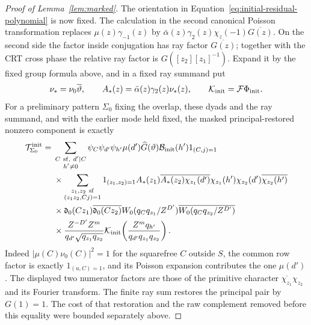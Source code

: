 \documentclass[12pt]{article}
\begin{document}
\begin{proof}[Proof of Lemma~\ref{lem:marked}]
The orientation in Equation~\eqref{eq:initial-residual-polynomial}
is now fixed.  The calculation in the second canonical Poisson
transformation replaces \(\mu(z)\gamma_{-1}(z)\) by
\(\bar\alpha(z)\gamma_2(z)\chi_z(-1)\overline{G(z)}\).
On the second side the factor inside conjugation has ray factor
\(\overline{G(z)}\); together with the CRT cross phase the relative
ray factor is \(G([z_2][z_1]^{-1})\).  Expand it by the fixed group
formula above, and in a fixed ray summand put
\[
 \nu_*=\nu_0\overline\vartheta,\qquad
 A_*(z)=\bar\alpha(z)\gamma_2(z)\nu_*(z),\qquad
 \mathcal K_{\rm init}=\mathcal F\Phi_{\rm init}.
\]
For a preliminary pattern \(\Sigma_0\) fixing the overlap, these
dyads and the ray summand, and with the earlier mode held fixed, the masked
principal-restored nonzero component is exactly
\begin{equation}\label{eq:initial-formal-component}
 \begin{split}
 \mathcal T^{\rm init}_{\Sigma_0}={}&
 \sum_{\substack{C\ {\rm sf},\ d'\mid C\\h'\ne0}}
 \psi_C\psi_{d'}\psi_{h'}\mu(d')\widehat G(\vartheta)
 \mathcal B_{\rm init}(h')1_{(C,j)=1}\\
 &\times\sum_{\substack{z_1,z_2\ {\rm sf}\\(z_1z_2,Cj)=1}}
 1_{(z_1,z_2)=1}
 A_*(z_1)\overline{A_*(z_2)}
 \overline{\chi_{z_1}(d')}\chi_{z_1}(h')
 \chi_{z_2}(d')\overline{\chi_{z_2}(h')}\\
 &\times\mathfrak d_0(Cz_1)\overline{\mathfrak d_0(Cz_2)}
 W_0(q_Cq_{z_1}/Z^{D'})\overline{W_0(q_Cq_{z_2}/Z^{D'})}\\
 &\times\frac{Z^{-D'}Z^m}{q_{d'}\sqrt{q_{z_1}q_{z_2}}}
 \mathcal K_{\rm init}\!\left(
       \frac{Z^mq_{h'}}{q_{d'}q_{z_1}q_{z_2}}\right).
 \end{split}
\end{equation}
Indeed \(|\mu(C)\nu_0(C)|^2=1\) for the squarefree \(C\) outside
\(S\), the common row factor is exactly \(1_{(u,C)=1}\), and its
Poisson expansion contributes the one \(\mu(d')\).  The displayed
two numerator factors are those of the primitive character
\(\overline{\chi_{z_1}}\chi_{z_2}\) and its Fourier transform.
The finite ray sum restores the principal pair by \(G(1)=1\).
The cost of that restoration and the raw complement removed before
this equality were bounded separately above.


\end{proof}
\end{document}
